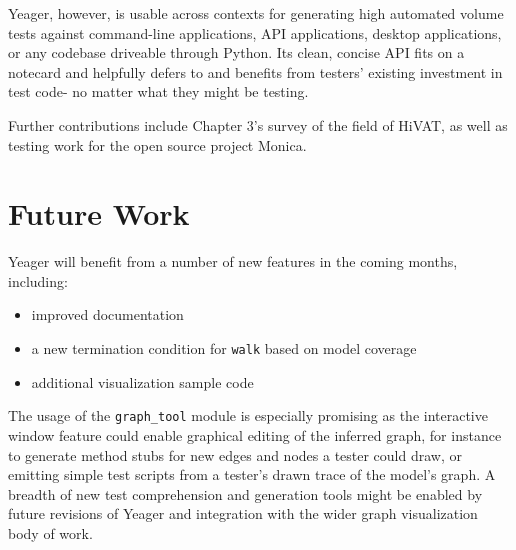 Yeager, however, is usable across contexts for generating high automated volume tests against command-line applications, API applications, desktop applications, or any codebase driveable through Python. Its clean, concise API fits on a notecard and helpfully defers to and benefits from testers' existing investment in test code- no matter what they might be testing.

Further contributions include Chapter 3's survey of the field of HiVAT, as well as testing work for the open source project Monica.

\section{Future Work}
Yeager will benefit from a number of new features in the coming months, including:
\begin{itemize}
  \item improved documentation
  \item a new termination condition for \texttt{walk} based on model coverage
  \item additional visualization sample code
\end{itemize}

The usage of the \texttt{graph\_tool} module is especially promising as the interactive window feature could enable graphical editing of the inferred graph, for instance to generate method stubs for new edges and nodes a tester could draw, or emitting simple test scripts from a tester's drawn trace of the model's graph. A breadth of new test comprehension and generation tools might be enabled by future revisions of Yeager and integration with the wider graph visualization body of work.
